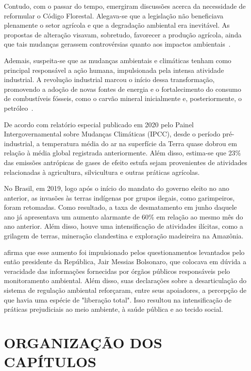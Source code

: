     Contudo, com o passar do tempo, emergiram discussões acerca da necessidade de reformular o Código Florestal. 
    Alegava-se que a legislação não beneficiava plenamente o setor agrícola e que a degradação ambiental era inevitável. 
    As propostas de alteração visavam, sobretudo, favorecer a produção agrícola, ainda que tais mudanças gerassem 
    controvérsias quanto aos impactos ambientais~\cite{Araujo_Boaventura_Silva2022}.
    
    Ademais, suspeita-se que as mudanças ambientais e climáticas tenham como principal responsável a ação humana, 
    impulsionada pela intensa atividade industrial. A revolução industrial marcou o início dessa transformação, 
    promovendo a adoção de novas fontes de energia e o fortalecimento do consumo de combustíveis fósseis, como o carvão 
    mineral inicialmente e, posteriormente, o petróleo~\cite{mendoncca2006aquecimento}.
    
    De acordo com relatório especial publicado em 2020 pelo Painel Intergovernamental sobre Mudanças Climáticas (IPCC), 
    desde o período pré-industrial, a temperatura média do ar na superfície da Terra quase dobrou em relação à média 
    global registrada anteriormente. Além disso, estima-se que 23\% das emissões antrópicas de gases de efeito estufa 
    sejam provenientes de atividades relacionadas à agricultura, silvicultura e outras práticas agrícolas.

    No Brasil, em 2019, logo após o início do mandato do governo eleito no ano anterior, as invasões às terras 
    indígenas por grupos ilegais, como garimpeiros, foram retomadas. Como resultado, a taxa de desmatamento em 
    junho daquele ano já apresentava um aumento alarmante de 60\% em relação ao mesmo mês do ano anterior. 
    Além disso, houve uma intensificação de atividades ilícitas, como a grilagem de terras, mineração clandestina 
    e exploração madeireira na Amazônia.

     afirma que esse aumento foi impulsionado pelos questionamentos levantados pelo então 
    presidente da República, Jair Messias Bolsonaro, que colocava em dúvida a veracidade das informações fornecidas 
    por órgãos públicos responsáveis pelo monitoramento ambiental. Além disso, suas declarações sobre a desarticulação do sistema de 
    regulação ambiental reforçaram, entre seus apoiadores, a percepção de que havia uma espécie de "liberação total".
    Isso resultou na intensificação de práticas prejudiciais ao meio ambiente, à saúde pública e ao tecido social.



\section{ORGANIZAÇÃO DOS CAPÍTULOS}
